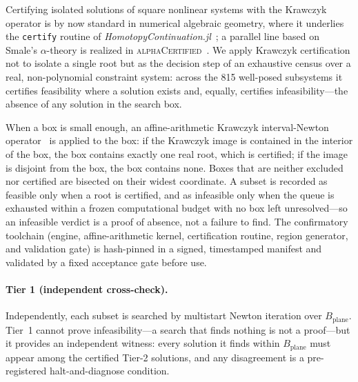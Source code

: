 \documentclass[11pt]{article}
\newcommand{\Bplane}{B_{\mathrm{plane}}}
\begin{document}
Certifying isolated solutions of square nonlinear systems with the Krawczyk operator is by now standard in numerical algebraic geometry, where it underlies the \texttt{certify} routine of \emph{HomotopyContinuation.jl}~\cite{Breiding2023}; a parallel line based on Smale's $\alpha$-theory is realized in \textsc{alphaCertified}~\cite{HauensteinSottile2012}. We apply Krawczyk certification not to isolate a single root but as the decision step of an exhaustive census over a real, non-polynomial constraint system: across the 815 well-posed subsystems it certifies feasibility where a solution exists and, equally, certifies infeasibility---the absence of any solution in the search box.

When a box is small enough, an affine-arithmetic Krawczyk interval-Newton operator~\cite{Krawczyk1969,Neumaier1990} is applied to the box: if the Krawczyk image is contained in the interior of the box, the box contains exactly one real root, which is certified; if the image is disjoint from the box, the box contains none. Boxes that are neither excluded nor certified are bisected on their widest coordinate. A subset is recorded as feasible only when a root is certified, and as infeasible only when the queue is exhausted within a frozen computational budget with no box left unresolved---so an infeasible verdict is a proof of absence, not a failure to find. The confirmatory toolchain (engine, affine-arithmetic kernel, certification routine, region generator, and validation gate) is hash-pinned in a signed, timestamped manifest and validated by a fixed acceptance gate before use.

\paragraph{Tier 1 (independent cross-check).}
Independently, each subset is searched by multistart Newton iteration over $\Bplane$. Tier~1 cannot prove infeasibility---a search that finds nothing is not a proof---but it provides an independent witness: every solution it finds within $\Bplane$ must appear among the certified Tier-2 solutions, and any disagreement is a pre-registered halt-and-diagnose condition.
\end{document}
